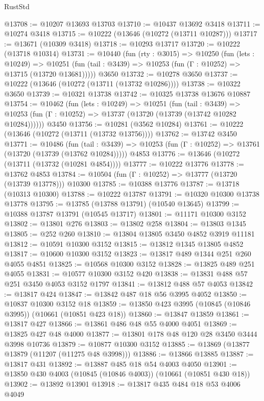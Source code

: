 \begin{lexlean}{RustStd}
\begin{coremodule}
@13708 := @10207 @13693 @13703
@13710 := @10437 @13692 @3418
@13711 := @10274 @3418
@13715 := @10222 (@13646 (@10272 (@13711 @10287)))
@13717 := @13671 (@10309 @3418)
@13718 := @10293 @13717
@13720 := @10222 (@13718 @10314)
@13731 := @10440
    (fun (rty : @3015) =>
    @10250
      (fun (lets : @10249) =>
      @10251 (fun (tail : @3439) => @10253 (fun (Γ : @10252) => @13715 (@13720 @13681)))))
    @3650
@13732 := @10278 @3650
@13737 := @10222 (@13646 (@10272 (@13711 (@13732 @10286))))
@13738 := @10322 @3650
@13739 := @10321 @13738
@13742 := @10325 @13738 @13676 @10887
@13754 := @10462
    (fun (lets : @10249) =>
    @10251
      (fun (tail : @3439) =>
      @10253 (fun (Γ : @10252) => @13737 (@13720 (@13739 (@13742 @10282 @10284))))))
    @3450
@13756 := @10281 (@3562 @10284)
@13761 := @10222 (@13646 (@10272 (@13711 (@13732 @13756))))
@13762 := @13742 @3450
@13771 := @10486
    (fun (tail : @3439) => @10253 (fun (Γ : @10252) => @13761 (@13720 (@13739 (@13762 @10284)))))
    @4853
@13776 := @13646 (@10272 (@13711 (@13732 (@10281 @4854))))
@13777 := @10222 @13776
@13778 := @13762 @4853
@13784 := @10504 (fun (Γ : @10252) => @13777 (@13720 (@13739 @13778))) @10300
@13785 := @10388 @13776
@13787 := @13718 (@10313 @10300)
@13788 := @10222 @13787
@13791 := @10320 @10300 @13738 @13778
@13795 := @13785 (@13788 @13791) (@10540 @13645)
@13799 := @10388 @13787 @13791 (@10545 @13717)
@13801 := @11171 @10300 @3152
@13802 := @13801 @276
@13803 := @13802 @258
@13804 := @13803 @1345
@13805 := @252 @260
@13810 := @13804 @13805 @3450 @4852 @3919 @11181
@13812 := @10591 @10300 @3152
@13815 := @13812 @1345 @13805 @4852
@13817 := @10600 @10300 @3152
@13823 := @13817 @489 @1344 @251 @260 @4055 @4851
@13825 := @10568 @10300 @3152
@13828 := @13825 @489 @251 @4055
@13831 := @10577 @10300 @3152 @420
@13838 := @13831 @488 @57 @251 @3450 @4053 @3152 @1797
@13841 := @13812 @488 @57 @4053
@13842 := @13817 @424
@13847 := @13842 @487 @18 @56 @3995 @4052
@13850 := @10837 @10300 @3152 @18
@13859 := @13850 @423 @3995 (@10845 (@10846 @3995)) (@10661 (@10851 @423 @18))
@13860 := @13847 @13859
@13861 := @13817 @427
@13866 := @13861 @486 @48 @55 @4000 @4051
@13869 := @13825 @427 @48 @4000
@13877 := @13801 @178 @48 @120 @28 @3450 @3444 @3998 @10736
@13879 := @10877 @10300 @3152
@13885 := @13869 (@13877 @13879 (@11207 (@11275 @48 @3998)))
@13886 := @13866 @13885
@13887 := @13817 @431
@13892 := @13887 @485 @18 @54 @4003 @4050
@13901 := @13850 @430 @4003 (@10845 (@10846 @4003)) (@10661 (@10851 @430 @18))
@13902 := @13892 @13901
@13918 := @13817
    @435
    @484
    @18
    @53
    @4006
    @4049

\end{coremodule}
\end{lexlean}
